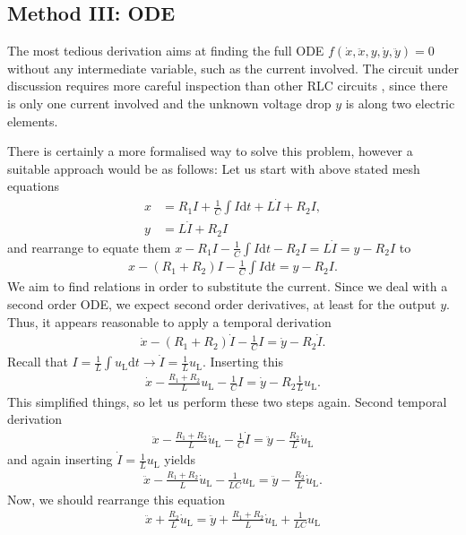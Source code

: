 \documentclass[a4paper,11pt,oneside]{scrartcl}
\newcommand\ul{u_\mathrm{L}}
\newcommand\dul{\dot{u}_\mathrm{L}}
\newcommand\dx{\dot{x}}
\newcommand\ddx{\ddot{x}}
\newcommand\dy{\dot{y}}
\newcommand\ddy{\ddot{y}}
\renewcommand\c{I}
\newcommand\dc{\dot{I}}
\newcommand\fsd{\mathrm{d}}
\begin{document}
\subsection{Method III: ODE}
%
The most tedious derivation aims at finding the full ODE $f(\dx,\ddx,y,\dy,\ddy)=0$
without any intermediate variable, such as the current involved.
%
The circuit under discussion requires more careful inspection than other RLC
circuits , since there is only one current involved and the unknown voltage drop
$y$ is along two electric elements.

There is certainly a more formalised way to solve this problem, however a suitable
approach would be as follows:
%
Let us start with above stated mesh equations
%
\begin{align}
x& = R_1 \c + \frac{1}{C} \int \c \fsd t + L \dc + R_2 \c,\\
y& = L \dc + R_2 \c
\end{align}
%
and rearrange to equate them
$x - R_1 \c - \frac{1}{C} \int \c \fsd t - R_2 \c = L \dc = y - R_2 \c$
to
%
\begin{align}
x - (R_1+R_2) \c - \frac{1}{C} \int \c \fsd t = y - R_2 \c.
\end{align}
%
We aim to find relations in order to substitute the current. Since we deal with a
second order ODE, we expect second order derivatives, at least for the output $y$.
%
Thus, it appears reasonable to apply a temporal derivation
%
\begin{align}
\dx - (R_1+R_2) \dc - \frac{1}{C} \c  = \dy - R_2 \dc.
\end{align}
%
Recall that $\c = \frac{1}{L} \int \ul \fsd t \rightarrow \dc = \frac{1}{L} \ul$.
%
Inserting this
%
\begin{align}
\dx - \frac{R_1+R_2}{L} \ul - \frac{1}{C} \c  = \dy - R_2 \frac{1}{L} \ul.
\end{align}
%
This simplified things, so let us perform these two steps again.
%
Second temporal derivation
%
\begin{align}
\ddx - \frac{R_1+R_2}{L} \dul - \frac{1}{C} \dc  = \ddy - \frac{R_2}{L} \dul
\end{align}
%
and again inserting $\dc = \frac{1}{L} \ul$ yields
%
\begin{align}
\ddx - \frac{R_1+R_2}{L} \dul - \frac{1}{L C} \ul  = \ddy - \frac{R_2}{L} \dul.
\end{align}
%
Now, we should rearrange this equation
%
\begin{align}
\label{eq:ODE_with_uL}
\ddx + \frac{R_2}{L} \dul = \ddy + \frac{R_1+R_2}{L} \dul + \frac{1}{L C} \ul
\end{align}
\end{document}

